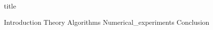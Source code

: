 \documentclass{article}
\begin{document}


{title}

\frontmatter

\tableofcontents

\listoffigures
\listoftables

\mainmatter


{Introduction}
{Theory}
{Algorithms}
{Numerical_experiments}
{Conclusion}



\newpage
\printbibliography[heading = bibintoc, title = Bibliography]    %


\end{document}
